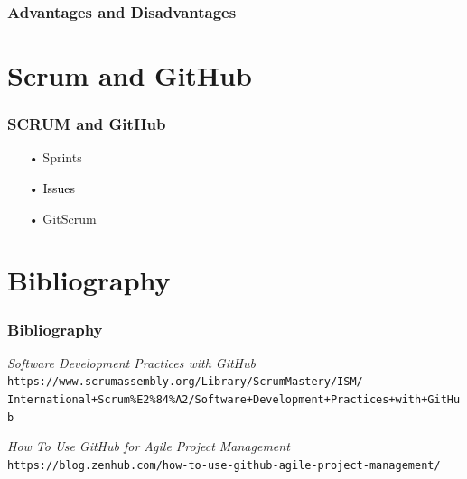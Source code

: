 \documentclass{beamer}
\begin{document}
\begin{frame}
    \frametitle{Advantages and Disadvantages}

    
\end{frame}

\section{Scrum and GitHub}

\begin{frame}
    \frametitle{SCRUM and GitHub}
 
    \begin{itemize}
    \color{gray}
    \item[•] Sprints
    \item[•] \textcolor{black}{Issues}
    \item[•] GitScrum
    \end{itemize}
    
    
\end{frame}

\section{Bibliography}

\begin{frame}
    \frametitle{Bibliography}

	\begin{thebibliography}{10}
	
	\textit{Software Development Practices with GitHub} \\
	\texttt{https://www.scrumassembly.org/Library/ScrumMastery/ISM/\\
	International+Scrum\%E2\%84\%A2/Software+Development+Practices+with+GitHub}
	
	\textit{How To Use GitHub for Agile Project Management} \\
	\texttt{https://blog.zenhub.com/how-to-use-github-agile-project-management/}

	\end{thebibliography}
    
    
\end{frame}
\end{document}
